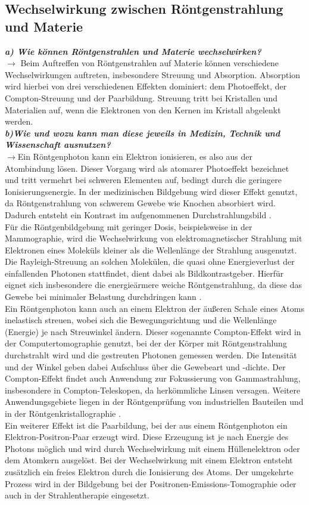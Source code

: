 \subsection{\label{subsec:FZV2}Wechselwirkung zwischen Röntgenstrahlung und Materie}
\textbf{\textit{a) Wie können Röntgenstrahlen und Materie wechselwirken?}} \\
$\rightarrow$ Beim Auftreffen von Röntgenstrahlen auf Materie können verschiedene Wechselwirkungen auftreten, insbesondere Streuung und Absorption. Absorption wird hierbei von drei verschiedenen Effekten dominiert: dem Photoeffekt, der Compton-Streuung und der Paarbildung. Streuung tritt bei Kristallen und Materialien auf, wenn die Elektronen von den Kernen im Kristall abgelenkt werden. \\
\textbf{\textit{b)Wie und wozu kann man diese jeweils in Medizin, Technik und Wissenschaft
ausnutzen?}}\\
$\rightarrow$Ein Röntgenphoton kann ein Elektron ionisieren, es also aus der Atombindung lösen. 
Dieser Vorgang wird als atomarer Photoeffekt bezeichnet und tritt vermehrt bei schweren Elementen auf, 
bedingt durch die geringere Ionisierungsenergie. 
In der medizinischen Bildgebung wird dieser Effekt genutzt, da Röntgenstrahlung von schwerem Gewebe wie Knochen absorbiert wird. 
Dadurch entsteht ein Kontrast im aufgenommenen Durchstrahlungsbild \cite{Demtroder}. \\
Für die Röntgenbildgebung mit geringer Dosis, beispielsweise in der Mammographie, 
wird die Wechselwirkung von elektromagnetischer Strahlung mit Elektronen eines Moleküls kleiner 
als die Wellenlänge der Strahlung ausgenutzt. 
Die Rayleigh-Streuung an solchen Molekülen, die quasi ohne Energieverlust der einfallenden Photonen stattfindet, 
dient dabei als Bildkontrastgeber. 
Hierfür eignet sich insbesondere die energieärmere weiche Röntgenstrahlung, 
da diese das Gewebe bei minimaler Belastung durchdringen kann \cite{Schwarz, WikiRo}. \\
Ein Röntgenphoton kann auch an einem Elektron der äußeren Schale eines Atoms inelastisch streuen, 
wobei sich die Bewegungsrichtung und die Wellenlänge (Energie) je nach Streuwinkel ändern. 
Dieser sogenannte Compton-Effekt wird in der Computertomographie genutzt, bei der der Körper mit Röntgenstrahlung durchstrahlt 
wird und die gestreuten Photonen gemessen werden. 
Die Intensität und der Winkel geben dabei Aufschluss über die Gewebeart und -dichte. 
Der Compton-Effekt findet auch Anwendung zur Fokussierung von Gammastrahlung, insbesondere in Compton-Teleskopen, 
da herkömmliche Linsen versagen. 
Weitere Anwendungsgebiete liegen in der Röntgenprüfung von industriellen Bauteilen und in der Röntgenkristallographie \cite{Schwarz, Compton}. \\
Ein weiterer Effekt ist die Paarbildung, bei der aus einem Röntgenphoton ein Elektron-Positron-Paar erzeugt wird. 
Diese Erzeugung ist je nach Energie des Photons möglich und wird durch Wechselwirkung mit einem Hüllenelektron oder dem Atomkern ausgelöst. 
Bei der Wechselwirkung mit einem Elektron entsteht zusätzlich ein freies Elektron durch die Ionisierung des Atoms. 
Der umgekehrte Prozess wird in der Bildgebung bei der Positronen-Emissions-Tomographie oder auch in der Strahlentherapie eingesetzt. \cite{WikiRo}


